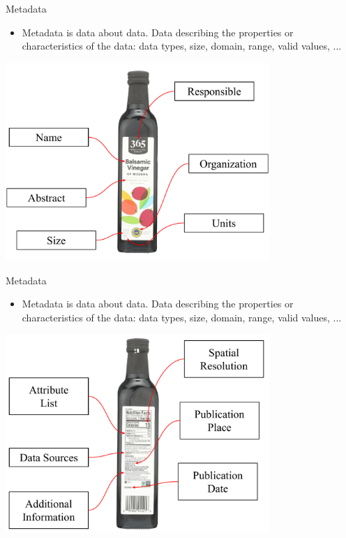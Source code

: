 \documentclass{beamer}
\begin{document}
\begin{frame}{Metadata}
    \begin{itemize}
        \item Metadata is data about data.  Data describing the properties or characteristics of the data: data types, size, domain, range, valid values, ...
    \end{itemize}
    \centering
    \includegraphics[width=0.75\textwidth]{figures/metadata1}
\end{frame}

\begin{frame}{Metadata}
    \begin{itemize}
        \item Metadata is data about data.  Data describing the properties or characteristics of the data: data types, size, domain, range, valid values, ...
    \end{itemize}
    \centering
    \includegraphics[width=0.75\textwidth]{figures/metadata2}
\end{frame}
\end{document}
